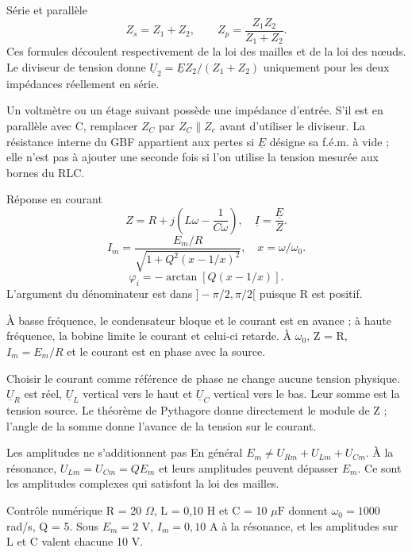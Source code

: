 \begin{loi}{Série et parallèle}
\[Z_s=Z_1+Z_2,\qquad Z_p=\frac{Z_1Z_2}{Z_1+Z_2}.\]Ces formules découlent respectivement de la loi des mailles et de la loi des nœuds. Le diviseur de tension donne $\underline U_2=\underline E Z_2/(Z_1+Z_2)$ uniquement pour les deux impédances réellement en série.
\end{loi}
Un voltmètre ou un étage suivant possède une impédance d’entrée. S’il est en parallèle avec C, remplacer $Z_C$ par $Z_C\parallel Z_e$ avant d’utiliser le diviseur. La résistance interne du GBF appartient aux pertes si $\underline E$ désigne sa f.é.m. à vide ; elle n’est pas à ajouter une seconde fois si l’on utilise la tension mesurée aux bornes du RLC.


\begin{loi}{Réponse en courant}
\[Z=R+j\left(L\omega-\frac1{C\omega}\right),\quad \underline I=\frac{\underline E}{Z}.\]\[I_m=\frac{E_m/R}{\sqrt{1+Q^2(x-1/x)^2}},\quad x=\omega/\omega_0.\]\[\varphi_i=-\arctan[Q(x-1/x)].\]L’argument du dénominateur est dans $]-\pi/2,\pi/2[$ puisque R est positif.
\end{loi}
À basse fréquence, le condensateur bloque et le courant est en avance ; à haute fréquence, la bobine limite le courant et celui-ci retarde. À $\omega_0$, Z = R, $I_m=E_m/R$ et le courant est en phase avec la source.


Choisir le courant comme référence de phase ne change aucune tension physique. $\underline U_R$ est réel, $\underline U_L$ vertical vers le haut et $\underline U_C$ vertical vers le bas. Leur somme est la tension source. Le théorème de Pythagore donne directement le module de Z ; l’angle de la somme donne l’avance de la tension sur le courant.
\begin{piege}{Les amplitudes ne s’additionnent pas}
En général $E_m\neq U_{Rm}+U_{Lm}+U_{Cm}$. À la résonance, $U_{Lm}=U_{Cm}=QE_m$ et leurs amplitudes peuvent dépasser $E_m$. Ce sont les amplitudes complexes qui satisfont la loi des mailles.
\end{piege}
\begin{methode}{Contrôle numérique}
R = 20 $\Omega$, L = 0,10 H et C = 10 $\mu\mathrm F$ donnent $\omega_0=1000$ rad/s, Q = 5. Sous $E_m=2$ V, $I_m=0{,}10$ A à la résonance, et les amplitudes sur L et C valent chacune 10 V.
\end{methode}


